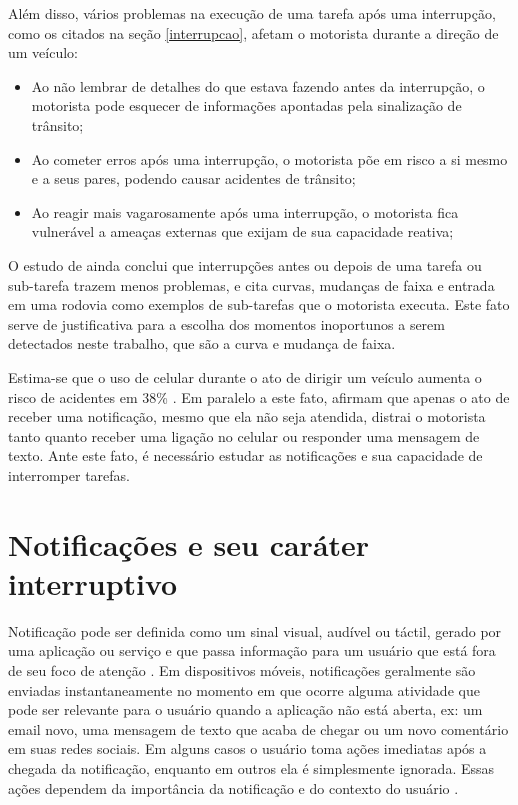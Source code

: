 Além disso, vários problemas na execução de uma tarefa após uma interrupção, como os citados na seção \ref{interrupcao}, afetam o
motorista durante a direção de um veículo:

\begin{itemize}
  \item Ao não lembrar de detalhes do que estava fazendo antes da interrupção, o motorista pode esquecer de informações
  apontadas pela sinalização de trânsito;
  \item Ao cometer erros após uma interrupção, o motorista põe em risco a si mesmo e a seus pares, podendo causar acidentes
  de trânsito;
  \item Ao reagir mais vagarosamente após uma interrupção, o motorista fica vulnerável a ameaças externas que exijam de sua
  capacidade reativa;
\end{itemize}

O estudo de  ainda conclui que interrupções antes ou depois de uma tarefa ou sub-tarefa trazem
menos problemas, e cita curvas, mudanças de faixa e entrada em uma rodovia como exemplos de sub-tarefas que o motorista executa.
Este fato serve de justificativa para a escolha dos momentos inoportunos a serem detectados neste trabalho, que são a curva
e mudança de faixa.

Estima-se que o uso de celular durante o ato de dirigir um veículo aumenta o risco de acidentes em 38\% \cite{laberge2001wireless}.
Em paralelo a este fato,  afirmam que apenas o ato de receber uma notificação, mesmo que ela não seja
atendida, distrai o motorista tanto quanto receber uma ligação no celular ou responder uma mensagem de texto. Ante este fato, é
necessário estudar as notificações e sua capacidade de interromper tarefas.

\section{Notificações e seu caráter interruptivo}
\label{notificacao}

Notificação pode ser definida como um sinal visual, audível ou táctil, gerado por uma aplicação
ou serviço e que passa informação para um usuário que está fora de seu foco de atenção \cite{iqbal2010notifications}.
Em dispositivos móveis, notificações geralmente são enviadas instantaneamente no momento em que ocorre alguma atividade que pode ser relevante
para o usuário quando a aplicação não está aberta, ex: um email novo, uma mensagem de texto que acaba de chegar ou um
novo comentário em suas redes sociais. Em alguns casos o usuário toma ações imediatas após a chegada da notificação,
enquanto em outros ela é simplesmente ignorada. Essas ações dependem da importância da notificação e do contexto do
usuário \cite{sahami2014large}.


